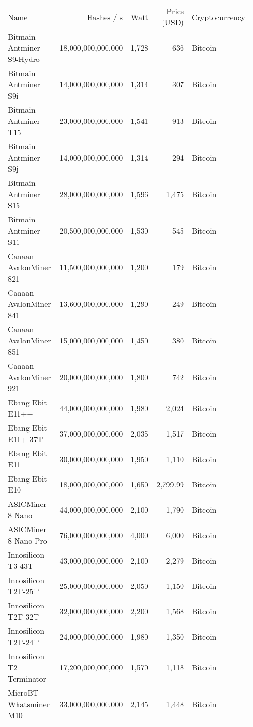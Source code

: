 \begin{longtable}{|p{}|r|r|r|p{}|}
    \hline
    Name & Hashes / s & Watt & Price (USD) & Cryptocurrency\\
    \hhline{|=|=|=|=|=|}
  \hline
  Bitmain Antminer S9-Hydro & 18,000,000,000,000 & 1,728 & 636 & Bitcoin \\
  Bitmain Antminer S9i & 14,000,000,000,000 & 1,314 & 307 & Bitcoin \\
  Bitmain Antminer T15 & 23,000,000,000,000 & 1,541 & 913 & Bitcoin \\
  Bitmain Antminer S9j & 14,000,000,000,000 & 1,314 & 294 & Bitcoin \\
  Bitmain Antminer S15 & 28,000,000,000,000 & 1,596 & 1,475 & Bitcoin \\
  Bitmain Antminer S11 & 20,500,000,000,000 & 1,530 & 545 & Bitcoin \\
  Canaan AvalonMiner 821 & 11,500,000,000,000 & 1,200 & 179 & Bitcoin \\
  Canaan AvalonMiner 841 & 13,600,000,000,000 & 1,290 & 249 & Bitcoin \\
  Canaan AvalonMiner 851 & 15,000,000,000,000 & 1,450 & 380 & Bitcoin \\
  Canaan AvalonMiner 921 & 20,000,000,000,000 & 1,800 & 742 & Bitcoin \\
  Ebang Ebit E11++ & 44,000,000,000,000 & 1,980 & 2,024 & Bitcoin \\
  Ebang Ebit E11+ 37T & 37,000,000,000,000 & 2,035 & 1,517 & Bitcoin \\
  Ebang Ebit E11 & 30,000,000,000,000 & 1,950 & 1,110 & Bitcoin \\
  Ebang Ebit E10 & 18,000,000,000,000 & 1,650 & 2,799.99 & Bitcoin \\
  ASICMiner 8 Nano & 44,000,000,000,000 & 2,100 & 1,790 & Bitcoin \\
  ASICMiner 8 Nano Pro & 76,000,000,000,000 & 4,000 & 6,000 & Bitcoin \\
  Innosilicon T3 43T & 43,000,000,000,000 & 2,100 & 2,279 & Bitcoin \\
  Innosilicon T2T-25T & 25,000,000,000,000 & 2,050 & 1,150 & Bitcoin \\
  Innosilicon T2T-32T & 32,000,000,000,000 & 2,200 & 1,568 & Bitcoin \\
  Innosilicon T2T-24T & 24,000,000,000,000 & 1,980 & 1,350 & Bitcoin \\
  Innosilicon T2 Terminator & 17,200,000,000,000 & 1,570 & 1,118 & Bitcoin \\
  MicroBT Whatsminer M10 & 33,000,000,000,000 & 2,145 & 1,448 & Bitcoin \\

\end{longtable}
